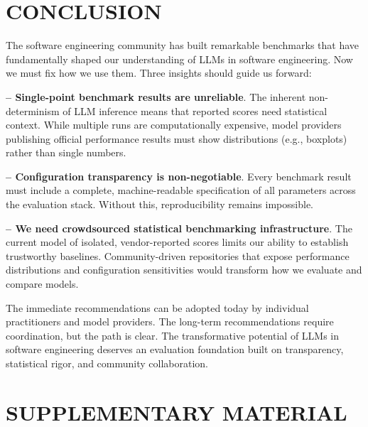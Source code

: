 \documentclass{IEEEcsmag}
\begin{document}


\section{CONCLUSION}
\label{sec:conclusion}

The software engineering community has built remarkable benchmarks that have fundamentally shaped our understanding of LLMs in software engineering. Now we must fix how we use them. Three insights should guide us forward:

\smallskip \noindent \textbf{-- Single-point benchmark results are unreliable}. The inherent non-determinism of LLM inference means that reported scores need statistical context. While multiple runs are computationally expensive, model providers publishing official performance results must show distributions (e.g., boxplots) rather than single numbers.

\smallskip \noindent \textbf{-- Configuration transparency is non-negotiable}. Every benchmark result must include a complete, machine-readable specification of all parameters across the evaluation stack. Without this, reproducibility remains impossible.
 
\smallskip \noindent \textbf{-- We need crowdsourced statistical benchmarking infrastructure}. The current model of isolated, vendor-reported scores limits our ability to establish trustworthy baselines. Community-driven repositories that expose performance distributions and configuration sensitivities would transform how we evaluate and compare models.

\smallskip

The immediate recommendations can be adopted today by individual practitioners and model providers. The long-term recommendations require coordination, but the path is clear. The transformative potential of LLMs in software engineering deserves an evaluation foundation built on transparency, statistical rigor, and community collaboration. 

\section{SUPPLEMENTARY MATERIAL}
\end{document}
